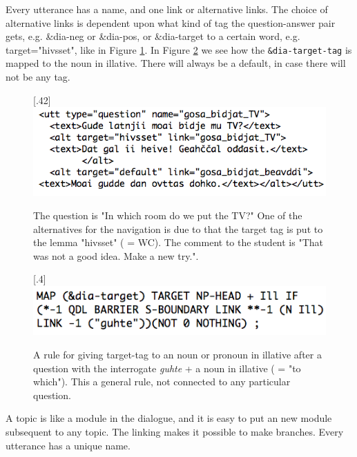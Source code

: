 \documentclass[11pt]{article}
\begin{document}
Every utterance has a name, and one link or alternative links. The choice of alternative links is dependent upon what kind of tag the question-answer pair gets, e.g. \&dia-neg or \&dia-pos, or \&dia-target to a certain word, e.g. target="hivsset", like in Figure \ref{TV}.  In Figure \ref{targetIll} we see how the \texttt{\&dia-target-tag} is mapped to the noun in illative. There will always be a default, in case there will not be any tag. \\

\begin{figure}[htbp]
\begin{center}
\scalebox{.40}[.42]{\includegraphics{presentation/img/gosabidjatTV2.png}}
\caption{The question is "In which room do we put the TV?" One of the alternatives for the navigation is due to that the target tag is put to the lemma "hivsset" ( = WC). The comment to the student is "That was not a good idea. Make a new try.".}
\label{TV}
\end{center}
\end{figure}


\begin{figure}[htbp]
\begin{center}
\scalebox{.4}[.4]{\includegraphics{presentation/img/targetIll2.png}}
\caption{A rule for giving target-tag to an noun or pronoun in illative after a question with the interrogate \textit{guhte} + a noun in illative ( = "to which"). This a general rule, not connected to any particular question.}
\label{targetIll}
\end{center}
\end{figure}

A topic is like a module in the dialogue, and it is easy to put an new module subsequent to any topic. The linking makes it possible to make branches. Every utterance has a unique name.  
\end{document}
